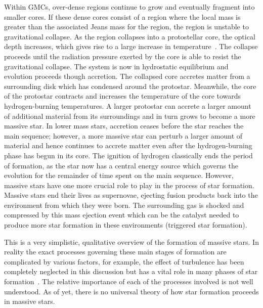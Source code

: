 {Within GMCs, over-dense regions continue to grow and eventually fragment into smaller cores.
If these dense cores consist of a region where the local mass is greater than the associated Jeans mass for the region, the region is unstable to gravitational collapse.
As the region collapses into a protostellar core, the optical depth increases, which gives rise to a large increase in temperature~\citep{Zinnecker07}.
The collapse proceeds until the radiation pressure exerted by the core is able to resist the gravitational collapse.
The system is now in hydrostatic equilibrium and evolution proceeds though accretion.
The collapsed core accretes matter from a surrounding disk which has condensed around the protostar.
Meanwhile, the core of the protostar contracts and increases the temperature of the core towards hydrogen-burning temperatures.
A larger protostar can accrete a larger amount of additional material from its surroundings and in turn grows to become a more massive star.
In lower mass stars, accretion ceases before the star reaches the main sequence; however, a more massive star can perturb a larger amount of material and hence continues to accrete matter even after the hydrogen-burning phase has begun in its core.
The ignition of hydrogen classically ends the period of formation, as the star now has a central energy source which governs the evolution for the remainder of time spent on the main sequence.
However, massive stars have one more crucial role to play in the process of star formation.
Massive stars end their lives as supernovae, ejecting fusion products back into the environment from which they were born.
The surrounding gas is shocked and compressed by this mass ejection event which can be the catalyst needed to produce more star formation in these environments (triggered star formation).

This is a very simplistic, qualitative overview of the formation of massive stars.
In reality the exact processes governing these main stages of formation are complicated by various factors, for example, the effect of turbulence has been completely neglected in this discussion but has a vital role in many phases of star formation~\citep{McKee07}.
The relative importance of each of the processes involved is not well understood.
As of yet, there is no universal theory of how star formation proceeds in massive stars.

}
